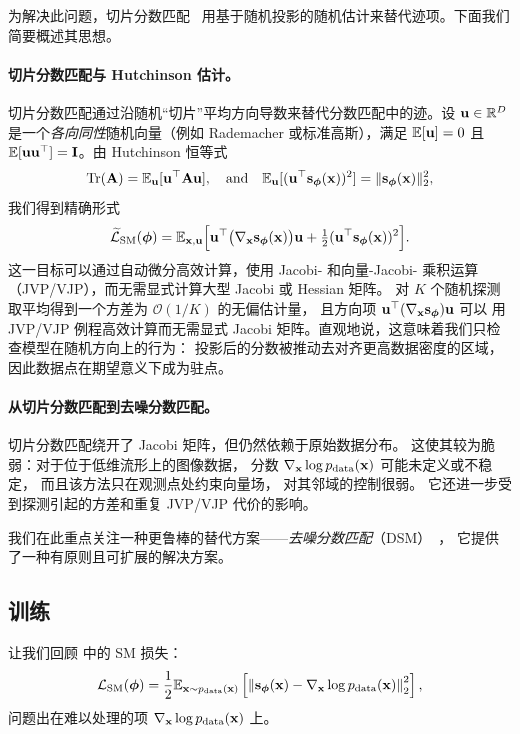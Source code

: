 为解决此问题，切片分数匹配~\citep{song2020sliced} 用基于随机投影的随机估计来替代迹项。下面我们简要概述其思想。
\paragraph{切片分数匹配与 Hutchinson 估计。} 切片分数匹配通过沿随机``切片''平均方向导数来替代分数匹配中的迹。设 ${\mathbf{u}}\in\mathbb{R}^D$ 是一个\emph{各向同性}随机向量（例如 Rademacher 或标准高斯），满足 $\mathbb{E}[{\mathbf{u}}]=0$ 且 $\mathbb{E}[{\mathbf{u}}{\mathbf{u}}^\top]=\mathbf I$。由 Hutchinson 恒等式
\[
\operatorname{Tr}({\mathbf{A}})=\mathbb{E}_{{\mathbf{u}}}[{\mathbf{u}}^\top {\mathbf{A}} {\mathbf{u}}],\quad\text{and}\quad\mathbb{E}_{{\mathbf{u}}}[({\mathbf{u}}^\top{\mathbf{s}}_{{\bm{\phi}}}({\mathbf{x}}))^2]=\|{\mathbf{s}}_{{\bm{\phi}}}({\mathbf{x}})\|_2^2,
\]
我们得到精确形式
\[
\widetilde{\mathcal{L}}_{\mathrm{SM}}({\bm{\phi}})
=\mathbb{E}_{{\mathbf{x}},{\mathbf{u}}} \Big[{\mathbf{u}}^\top\big(\nabla_{{\mathbf{x}}}{\mathbf{s}}_{{\bm{\phi}}}({\mathbf{x}})\big){\mathbf{u}}+\tfrac12({\mathbf{u}}^\top{\mathbf{s}}_{{\bm{\phi}}}({\mathbf{x}}))^2\Big].
\]
这一目标可以通过自动微分高效计算，使用 Jacobi- 和向量-Jacobi- 乘积运算（JVP/VJP），而无需显式计算大型 Jacobi 或 Hessian 矩阵。
对 $K$ 个随机探测取平均得到一个方差为 $\mathcal{O}(1/K)$ 的无偏估计量，
且方向项 ${\mathbf{u}}^\top(\nabla_{{\mathbf{x}}}{\mathbf{s}}_{{\bm{\phi}}}){\mathbf{u}}$ 可以
用 JVP/VJP 例程高效计算而无需显式 Jacobi 矩阵。直观地说，这意味着我们只检查模型在随机方向上的行为：
投影后的分数被推动去对齐更高数据密度的区域，
因此数据点在期望意义下成为驻点。

\paragraph{从切片分数匹配到去噪分数匹配。} 切片分数匹配绕开了 Jacobi 矩阵，但仍然依赖于原始数据分布。
这使其较为脆弱：对于位于低维流形上的图像数据，
分数 $\nabla_{{\mathbf{x}}}\log p_{\mathrm{data}}({\mathbf{x}})$ 可能未定义或不稳定，
而且该方法只在观测点处约束向量场，
对其邻域的控制很弱。
它还进一步受到探测引起的方差和重复 JVP/VJP 代价的影响。

我们在此重点关注一种更鲁棒的替代方案——\emph{去噪分数匹配}（DSM）~\citep{vincent2011connection}，
它提供了一种有原则且可扩展的解决方案。



\subsection{训练}
让我们回顾  中的 SM 损失：
\begin{align*}
     \mathcal{L}_{\text{SM}}(\bm{\phi}) =  \frac{1}{2} \mathbb{E}_{{\mathbf{x}} \sim p_{\text{data}}({\mathbf{x}})} \left[ \left\lVert{\mathbf{s}}_{\bm{\phi}}({\mathbf{x}}) - \nabla_{{\mathbf{x}}} \log p_{\text{data}}({\mathbf{x}})\right\rVert_2^2 \right],
\end{align*}
问题出在难以处理的项 $\nabla_{{\mathbf{x}}} \log p_{\text{data}}({\mathbf{x}})$ 上。

